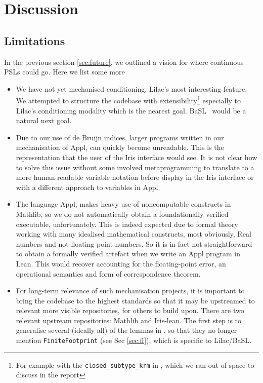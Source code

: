 \chapter{Discussion}
\section{Limitations}
In the previous section \ref{sec:future}, we outlined a vision for where continuous PSLs could go. Here we list some more

\begin{itemize}
\item We have not yet mechanised conditioning, Lilac's most interesting feature. We attempted to structure the codebase with extensibility\footnote{For example with the \texttt{closed\_subtype\_krm} in , which we ran out of space to discuss in the report} especially to
Lilac's conditioning modality which is the nearest goal. BaSL~\citep{basl} would be a natural next goal.
\item Due to our use of de Bruijn indices, larger programs written in our mechanisation of Appl, can quickly become unreadable. This is the representation that the user of the Iris interface
would see. It is not clear how to solve this issue without some involved metaprogramming to translate to a more human-readable variable notation before display in the Iris interface or
with a different approach to variables in Appl.
\item The language Appl, makes heavy use of noncomputable constructs in Mathlib, so we do not automatically obtain a foundationally verified executable, unfortunately.
This is indeed expected due to formal theory working with many idealised mathematical constructs, most obviously, Real numbers and not floating point numbers. So it is in fact not straightforward
to obtain a formally verified artefact when we write an Appl program in Lean. This would recover accounting for the floating-point error, an operational semantics and form of correspondence theorem.
\item For long-term relevance of such mechanisation projects, it is important to bring the codebase to the highest standards so that it may be upstreamed to relevant more visible repositories, for others to build upon.
There are two relevant upstream repositories: Mathlib and Iris-lean.
The first step is to generalise several (ideally all) of the lemmas in , so that they no longer mention \texttt{FiniteFootprint} (see Sec \ref{sec:ff}), which is specific to Lilac/BaSL.

\end{itemize}
